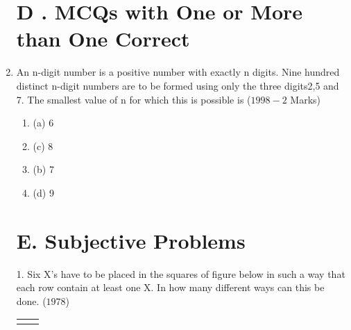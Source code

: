 \documentclass[journal,12pt,twocolumn]{IEEEtran}
\theoremstyle{remark}
\begin{document}
\begin{enumerate}[start=3]
\section*{D . MCQs with One or More than One Correct}
\item An n-digit number is a positive number with exactly n digits. Nine hundred distinct n-digit numbers are to be formed using only the three digits2,5 and 7. The smallest value of n for which  this is possible is
\hfill{($1998-2$ Marks)}\\
\begin{multicols}{2} 
\begin{enumerate}
[label=, left=0pt, labelsep=0pt, itemsep=1em]
\item(a) 6\item(c)  8\item(b) 7\item(d) 9\\
\end{enumerate}
\end{multicols}
 \section*{E. Subjective Problems}   
\item[1.]Six X's have to be placed in the squares of figure below in such a way that each row contain at least one X. In how many different ways can this be done.
\hfill{($1978$)}\\
\begin{center}
\begin{tabular}{|c|c|}
\hline
\quad&\quad  \\
\end{tabular}
\end{center}
\begin{center}
\begin{tabular}{|c|c|c|c|}
\hline
    \quad&\quad&\quad &\quad\\
    \hline
\end{tabular}
\end{center}
\begin{center}
\begin{tabular}{|c|c|}
   \quad& \quad\\
   \hline
\end{tabular}\\
\end{center}
\end{enumerate}
\end{document}
